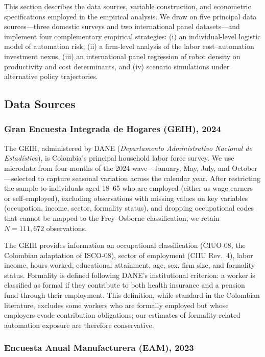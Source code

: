 This section describes the data sources, variable construction, and econometric specifications employed in the empirical analysis. We draw on five principal data sources---three domestic surveys and two international panel datasets---and implement four complementary empirical strategies: (i) an individual-level logistic model of automation risk, (ii) a firm-level analysis of the labor cost--automation investment nexus, (iii) an international panel regression of robot density on productivity and cost determinants, and (iv) scenario simulations under alternative policy trajectories.


\subsection{Data Sources}
\label{subsec:data_sources}

\subsubsection*{Gran Encuesta Integrada de Hogares (GEIH), 2024}

The GEIH, administered by DANE (\textit{Departamento Administrativo Nacional de Estad\'istica}), is Colombia's principal household labor force survey. We use microdata from four months of the 2024 wave---January, May, July, and October---selected to capture seasonal variation across the calendar year. After restricting the sample to individuals aged 18--65 who are employed (either as wage earners or self-employed), excluding observations with missing values on key variables (occupation, income, sector, formality status), and dropping occupational codes that cannot be mapped to the Frey--Osborne classification, we retain $N = 111{,}672$ observations.

The GEIH provides information on occupational classification (CIUO-08, the Colombian adaptation of ISCO-08), sector of employment (CIIU Rev.\ 4), labor income, hours worked, educational attainment, age, sex, firm size, and formality status. Formality is defined following DANE's institutional criterion: a worker is classified as formal if they contribute to both health insurance and a pension fund through their employment. This definition, while standard in the Colombian literature, excludes some workers who are formally employed but whose employers evade contribution obligations; our estimates of formality-related automation exposure are therefore conservative.

\subsubsection*{Encuesta Anual Manufacturera (EAM), 2023}

